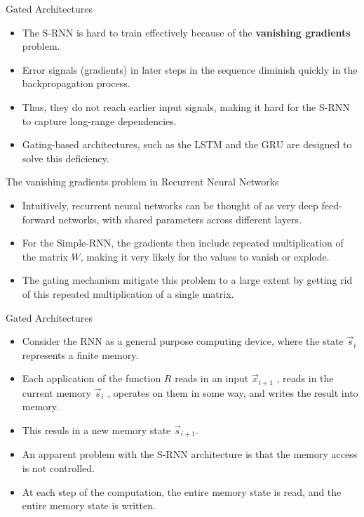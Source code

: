 \documentclass[handout]{beamer}
\begin{document}
\begin{frame}{Gated Architectures}
\begin{scriptsize}
\begin{itemize}
\item The S-RNN is hard to train effectively because of the \textbf{vanishing gradients} problem.
\item Error signals (gradients) in later steps in the sequence diminish quickly in the backpropagation process.
\item Thus, they do not reach earlier input signals, making it hard for the S-RNN to capture long-range dependencies.
\item Gating-based architectures, such as the LSTM \cite{hochreiter1997long} and the GRU \cite{cho2014learning} are designed to solve this deficiency.
\end{itemize}
\end{scriptsize}
\end{frame}


\begin{frame}{The vanishing gradients problem in Recurrent Neural Networks}
\begin{scriptsize}
\begin{itemize}
\item Intuitively, recurrent neural networks can be thought of as very deep feed-forward networks, with shared parameters across different layers.
\item For the Simple-RNN, the gradients then include repeated multiplication of the matrix $W$, making it very likely for the values to vanish or explode.
\item  The gating mechanism mitigate this problem to a large extent by getting rid of this repeated multiplication of a single matrix.
\end{itemize}
\end{scriptsize}
\end{frame}




\begin{frame}{Gated Architectures}
\begin{scriptsize}
\begin{itemize}
\item Consider the RNN as a general purpose computing device, where the state $\vec{s}_i$ represents a finite memory.
\item Each application of the function $R$ reads in an input $\vec{x}_{i+1}$ , reads in the current memory $\vec{s}_i$ , operates on them in some way, and writes the result into memory.
\item This resuls in a new memory state $\vec{s}_{i+1}$.
\item An apparent problem with the S-RNN architecture is that the memory access is not controlled. 
\item At each step of the computation, the entire memory state is read, and the entire memory state is written.
\end{itemize}
\end{scriptsize}
\end{frame}
\end{document}
